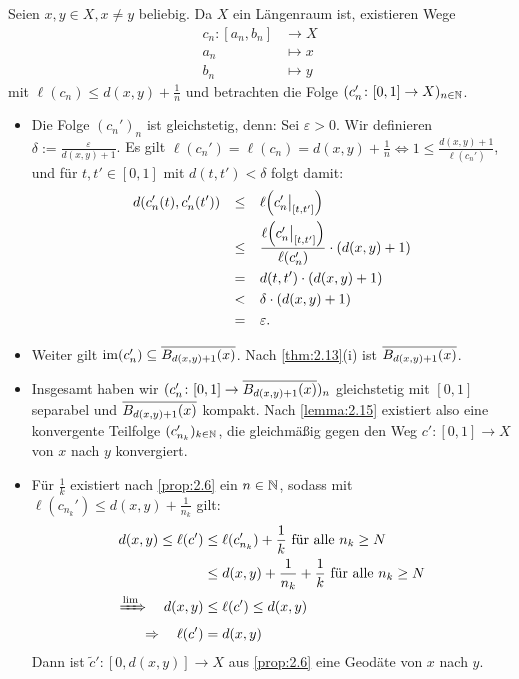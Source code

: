 \begin{beweis}
	Seien $x,y \in X, x\neq y$ beliebig.
	Da $X$ ein Längenraum ist, existieren Wege
	\begin{align*}
		c_n\colon [a_n,b_n] &\longrightarrow X \\
		a_n &\longmapsto x \\
		b_n &\longmapsto y
	\end{align*}
	mit $\ell(c_n) \leq d(x,y) + \frac{1}{n}$ und betrachten die Folge $(c_n'\colon [0,1] \rightarrow X)_{n \in \mathbb{N}}$.
	\begin{itemize}
		\item Die Folge $(c_n')_n$ ist gleichstetig, denn:
		Sei $\varepsilon > 0$.
		Wir definieren $\delta := \frac{\varepsilon}{d(x,y)+1}$. Es gilt $\ell(c_n') = \ell(c_n) = d(x,y) + \frac{1}{n} \Leftrightarrow 1 \leq \frac{d(x,y)+1}{\ell(c_n')}$, und für $t,t' \in [0,1]$ mit $d(t,t') < \delta$ folgt damit:
		\begin{align*}
			d(c_n'(t),c_n'(t')) &\stack{}{\leq} \ell \enbrace*{c_n' \big|_{[t,t']}} \\
			&\stack{}{\leq} \frac{\ell \enbrace*{c_n' \big|_{[t,t']}}}{\ell(c_n')} \cdot (d(x,y) + 1) \\
			&\stack{}{=} d(t,t') \cdot (d(x,y) + 1) \\
			&\stack{}{<} \delta \cdot (d(x,y) + 1) \\
			&\stack{}{=} \varepsilon.
		\end{align*}
		\item Weiter gilt $\operatorname{im}(c_n') \subseteq \overline{B_{d(x,y)+1}(x)}$.
		Nach \autoref{thm:2.13}(i) ist $\overline{B_{d(x,y)+1}(x)}$.
		\item Insgesamt haben wir $(c_n'\colon [0,1] \rightarrow \overline{B_{d(x,y)+1}(x)})_n$ gleichstetig mit $[0,1]$ separabel und $\overline{B_{d(x,y)+1}(x)}$ kompakt.
		Nach \autoref{lemma:2.15} existiert also eine konvergente Teilfolge $(c_{n_k}')_{k \in \mathbb{N}}$, die gleichmäßig gegen den Weg $c'\colon [0,1] \rightarrow X$ von $x$ nach $y$ konvergiert.
		\item Für $\frac{1}{k}$ existiert nach \autoref{prop:2.6} ein $n \in \mathbb{N}$, sodass mit $\ell(c_{n_k}') \leq  d(x,y) + \frac{1}{n_k}$ gilt:
		\begin{align*}
			d(x,y) \leq \ell(c') &\leq \ell(c_{n_k}') + \frac{1}{k} \text{ für alle } n_k \geq N \\
			&\leq d(x,y) + \frac{1}{n_k} + \frac{1}{k} \text{ für alle } n_k \geq N \\
			\xRightarrow{\lim} \quad d(x,y) &\leq \ell(c') \leq d(x,y) \\
			\Rightarrow \quad \ell(c') &= d(x,y)
		\end{align*}
		Dann ist $\tilde{c}' \colon [0,d(x,y)] \rightarrow X$ aus \autoref{prop:2.6} eine Geodäte von $x$ nach $y$. \qedhere
	\end{itemize}
\end{beweis}

